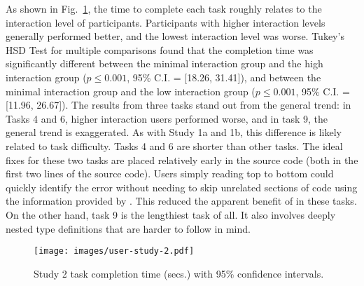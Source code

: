 As shown in  Fig.~\ref{fig:r4-analysis}, the time to complete each task roughly relates to the interaction level of participants. Participants with higher interaction levels generally performed better, and the lowest interaction level was worse. Tukey’s HSD Test for multiple comparisons found that the completion time was significantly different between the minimal interaction group and the high interaction group ($p \le 0.001$, 95\% C.I. = [18.26, 31.41]), and between the minimal interaction group and the low interaction group ($p \le 0.001$, 95\% C.I. = [11.96, 26.67]). The results from three tasks stand out from the general trend: in Tasks 4 and 6, higher interaction users performed worse, and in task 9, the general trend is exaggerated. As with Study 1a and 1b, this difference is likely related to task difficulty. Tasks 4 and 6 are shorter than other tasks. The ideal fixes for these two tasks are placed relatively early in the source code (both in the first two lines of the source code). Users simply reading top to bottom could quickly identify the error without needing to skip unrelated sections of code using the information provided by \chameleon{}. This reduced the apparent benefit of \chameleon{} in these tasks. On the other hand, task 9 is the lengthiest task of all. It also involves deeply nested type definitions that are harder to follow in mind.

\begin{figure}
    \centering
    \texttt{[image: images/user-study-2.pdf]}
    \caption{Study 2 task completion time (secs.) with 95\% confidence intervals.}
    \label{fig:r4-analysis}
\end{figure}




